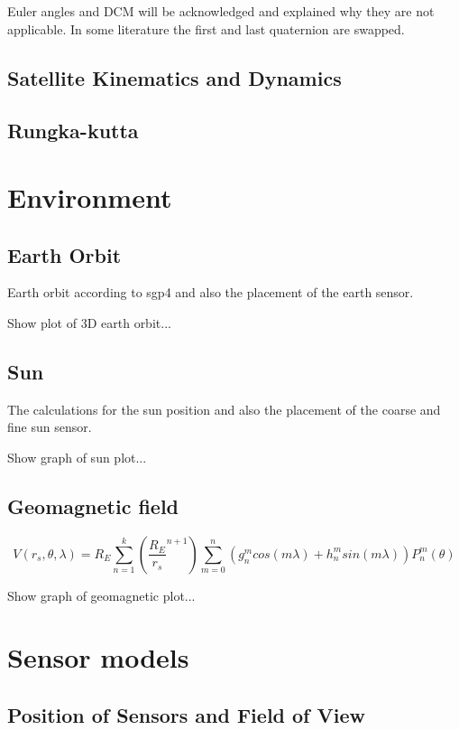 Euler angles and DCM will be acknowledged and explained why they are not applicable.
In some literature the first and last quaternion are swapped.

\subsection{Satellite Kinematics and Dynamics}

\subsection{Rungka-kutta}

\section{Environment}
\subsection{Earth Orbit}
Earth orbit according to sgp4 and also the placement of the earth sensor.

Show plot of 3D earth orbit...

\subsection{Sun}
The calculations for the sun position and also the placement of the coarse and fine sun sensor.

Show graph of sun plot...

\subsection{Geomagnetic field}

\begin{equation}
\label{Eq-Geomagnetic_field}
V(r_s,\theta, \lambda) = R_E \sum_{n=1}^{k}\left(\frac{R_E}{r_s}^{n+1}\right)\sum_{m=0}^{n}\left(g_n^mcos(m\lambda) + h_n^msin(m\lambda)\right)P_n^m(\theta)
\end{equation}

Show graph of geomagnetic plot...

\section{Sensor models}
\subsection{Position of Sensors and Field of View}

